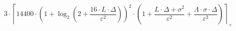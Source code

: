 \[3 \cdot \left\lceil 14400 \cdot \left(1 + \log_{2}\left(2 + \frac{16 \cdot L \cdot \Delta}{\varepsilon^{2}}\right)\right)^{2} \cdot \left(1 + \frac{L \cdot \Delta + \sigma^{2}}{\varepsilon^{2}} + \frac{\Lambda \cdot \sigma \cdot \Delta}{\varepsilon^{3}}\right) \right\rceil_{+}\]
